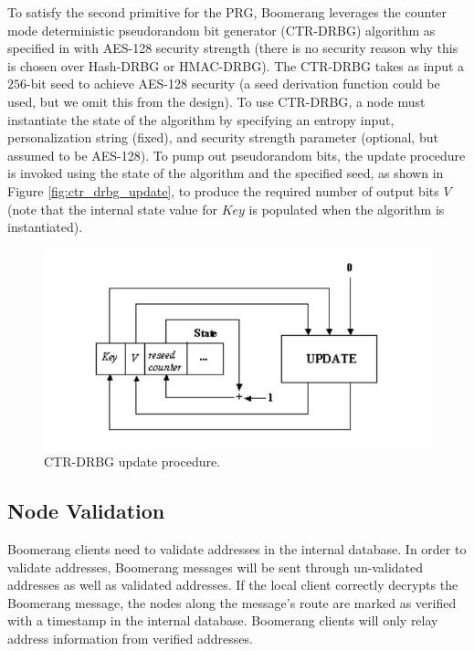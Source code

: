To satisfy the second primitive for the PRG, Boomerang leverages the counter mode deterministic pseudorandom bit generator ({\sf CTR-DRBG}) algorithm as specified in \cite{nist-prng} with AES-128 security strength (there is no security reason why this is chosen over {\sf Hash-DRBG} or {\sf HMAC-DRBG}). The {\sf CTR-DRBG} takes as input a $256$-bit seed to achieve AES-128 security (a seed derivation function could be used, but we omit this from the design). To use {\sf CTR-DRBG}, a node must instantiate the state of the algorithm by specifying an entropy input, personalization string (fixed), and security strength parameter (optional, but assumed to be AES-128). To pump out pseudorandom bits, the update procedure is invoked using the state of the algorithm and the specified seed, as shown in Figure \ref{fig:ctr_drbg_update}, to produce the required number of output bits $V$ (note that the internal state value for $Key$ is populated when the algorithm is instantiated). 

\begin{figure}[ht!]
\begin{center}
\includegraphics[scale=0.35]{./images/ctr_drbg_update.png}
\caption{{\sf CTR-DRBG} update procedure.}
\label{fig:boomerang_message}
\end{center}
\end{figure}

\subsection{Node Validation}
Boomerang clients need to validate addresses in the internal database. In order to validate addresses, Boomerang messages will be sent through un-validated addresses as well as validated addresses. If the local client correctly decrypts the Boomerang message, the nodes along the message’s route are marked as verified with a timestamp in the internal database. Boomerang clients will only relay address information from verified addresses.

